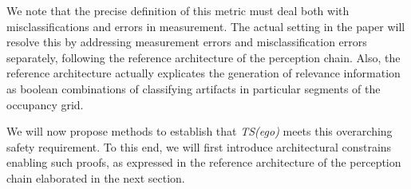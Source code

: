 We note that the precise definition of this metric must deal both with misclassifications and errors in measurement. The actual setting in the paper will resolve this by addressing measurement errors and misclassification errors separately, following the reference architecture of the perception chain. Also, the reference architecture actually explicates the generation of relevance information as boolean combinations of classifying artifacts in particular segments of the occupancy grid.

We will now propose methods to establish that \textit{TS(ego)} meets this overarching safety requirement. To this end, we will first introduce architectural constrains enabling such proofs, as expressed in the reference architecture of the perception chain elaborated in the next section.



